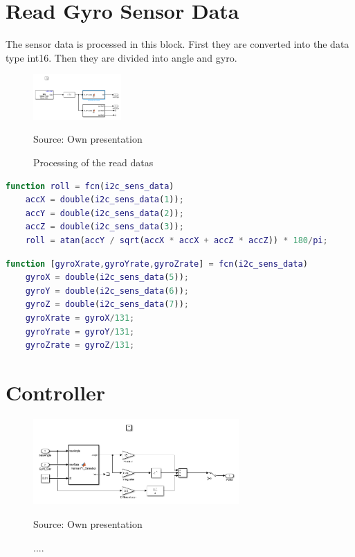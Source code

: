 	

\section{Read Gyro Sensor Data}
The sensor data is processed in this block. First they are converted into the data type int16. Then they are divided into angle and gyro.

	\begin{figure}[!htbp]
		\centering
		\includegraphics[width=0.3\textwidth]{figures/read.PNG}
		\caption{Processing of the read datas}	
		Source: Own presentation	
		\label{fig:read}	
	\end{figure}

	\begin{mdframed}
		\begin{lstlisting}[caption={Conversion from the acceleration to the angle}, language=matlab,label={lst:roll}]
	function roll = fcn(i2c_sens_data)
	accX = double(i2c_sens_data(1));
	accY = double(i2c_sens_data(2));
	accZ = double(i2c_sens_data(3));
	roll = atan(accY / sqrt(accX * accX + accZ * accZ)) * 180/pi;		
		\end{lstlisting}
	\end{mdframed}

	\begin{mdframed}
		\begin{lstlisting}[caption={Conversion to the gyros}, language=matlab,label={lst:gyro}]
	function [gyroXrate,gyroYrate,gyroZrate] = fcn(i2c_sens_data)
	gyroX = double(i2c_sens_data(5));
	gyroY = double(i2c_sens_data(6));
	gyroZ = double(i2c_sens_data(7));
	gyroXrate = gyroX/131;
	gyroYrate = gyroY/131;
	gyroZrate = gyroZ/131;	
		\end{lstlisting}
	\end{mdframed}


\section{Controller}

	\begin{figure}[!htbp]
		\centering
		\includegraphics[width=0.7\textwidth]{figures/controller.PNG}
		\caption{....}	
		Source: Own presentation	
		\label{fig:controller}	
	\end{figure}


